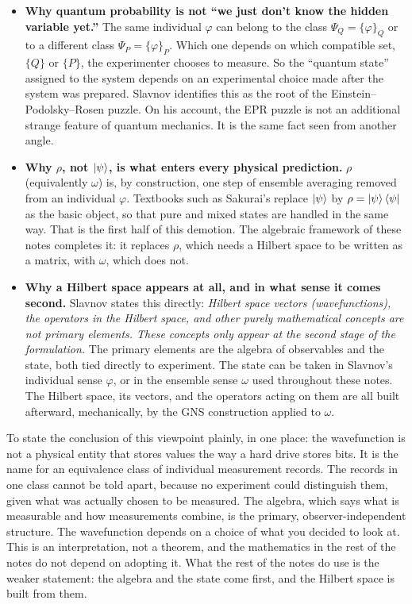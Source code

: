 \begin{itemize}
\item \textbf{Why quantum probability is not ``we just don't know the hidden variable yet.''} The same
individual $\varphi$ can belong to the class $\Psi_Q=\{\varphi\}_Q$ or to a different class
$\Psi_P=\{\varphi\}_P$. Which one depends on which compatible set, $\{Q\}$ or $\{P\}$, the experimenter chooses
to measure. So the ``quantum state'' assigned to the system depends on an experimental choice made after the
system was prepared. Slavnov identifies this as the root of the Einstein--Podolsky--Rosen puzzle. On his
account, the EPR puzzle is not an additional strange feature of quantum mechanics. It is the same fact seen
from another angle.
\item \textbf{Why $\rho$, not $\ket\psi$, is what enters every physical prediction.} $\rho$ (equivalently
$\omega$) is, by construction, one step of ensemble averaging removed from an individual $\varphi$. Textbooks
such as Sakurai's replace $\ket\psi$ by $\rho=\ket\psi\bra\psi$ as the basic object, so that pure and mixed
states are handled in the same way. That is the first half of this demotion. The algebraic framework of these
notes completes it: it replaces $\rho$, which needs a Hilbert space to be written as a matrix, with $\omega$,
which does not.
\item \textbf{Why a Hilbert space appears at all, and in what sense it comes second.} Slavnov states this
directly: \emph{Hilbert space vectors (wavefunctions), the operators in the Hilbert space, and other purely
mathematical concepts are not primary elements. These concepts only appear at the second stage of the
formulation.} The primary elements are the algebra of observables and the state, both tied directly to
experiment. The state can be taken in Slavnov's individual sense $\varphi$, or in the ensemble sense $\omega$
used throughout these notes. The Hilbert space, its vectors, and the operators acting on them are all built
afterward, mechanically, by the GNS construction applied to $\omega$.
\end{itemize}

To state the conclusion of this viewpoint plainly, in one place: the wavefunction is not a physical entity
that stores values the way a hard drive stores bits. It is the name for an equivalence class of individual
measurement records. The records in one class cannot be told apart, because no experiment could distinguish
them, given what was actually chosen to be measured. The algebra, which says what is measurable and how
measurements combine, is the primary, observer-independent structure. The wavefunction depends on a choice
of what you decided to look at. This is an interpretation, not a theorem, and the mathematics in the rest of
the notes do not depend on adopting it. What the rest of the notes do use is the weaker statement: the
algebra and the state come first, and the Hilbert space is built from them.

